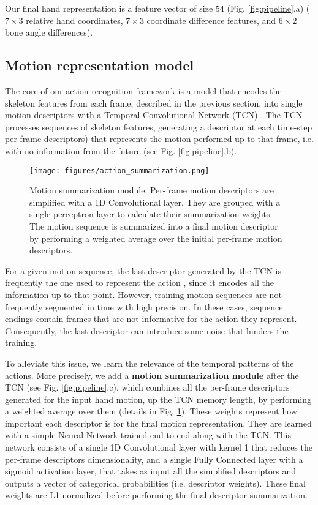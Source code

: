 \documentclass[letterpaper, 10 pt, conference]{ieeeconf}
\begin{document}
Our final hand representation is a feature vector of size \(54\) (Fig. \ref{fig:pipeline}.a) ($7\times3$ relative hand coordinates, $7\times3$ coordinate difference features, and $6\times2$ bone angle differences).



\subsection{Motion representation model}\label{sec:tcn}

The core of our action recognition framework is a model that encodes the skeleton features from each frame, described in the previous section, into single motion descriptors with a Temporal Convolutional Network (TCN) \cite{bai2018empirical, oord2016wavenet}. 
The TCN processes sequences of skeleton features, generating a descriptor at each time-step per-frame descriptors) that represents the motion performed up to that frame, i.e. with no information from the future (see Fig. \ref{fig:pipeline}.b).


\begin{figure}
    \centering
    \texttt{[image: figures/action\_summarization.png]}
    \caption{Motion summarization module. Per-frame motion descriptors are simplified with a 1D Convolutional layer. They are grouped with a single perceptron layer to calculate their summarization weights. The motion sequence is summarized into a final motion descriptor by performing a weighted average over the initial per-frame motion descriptors.}
    \label{fig:summarization}
\end{figure}

For a given motion sequence, the last descriptor generated by the TCN is frequently the one used to represent the action \cite{sabater2021oneshot}, since it encodes all the information up to that point. 
However, training motion sequences are not frequently segmented in time with high precision. In these cases, sequence endings contain frames that are not informative for the action they represent. Consequently, the last descriptor can introduce some noise that hinders the training.

To alleviate this issue, we learn the relevance of the temporal patterns of the actions. More precisely, we add a \textbf{motion summarization module} after the TCN (see Fig. \ref{fig:pipeline}.c), which combines all the per-frame descriptors generated for 
the input hand motion, 
up the TCN memory length, by performing a weighted average over them (details in Fig. \ref{fig:summarization}). 
These weights represent how important each descriptor is for the final motion representation. They are learned with a simple Neural Network trained end-to-end along with the TCN. 
This network consists of a single 1D Convolutional layer with kernel 1 that reduces the per-frame descriptors dimensionality, and a single Fully Connected layer with a sigmoid activation layer, that takes as input all the simplified descriptors and outputs a vector of categorical probabilities (i.e. descriptor weights). These final weights are L1 normalized before performing the final descriptor summarization. 
\end{document}
